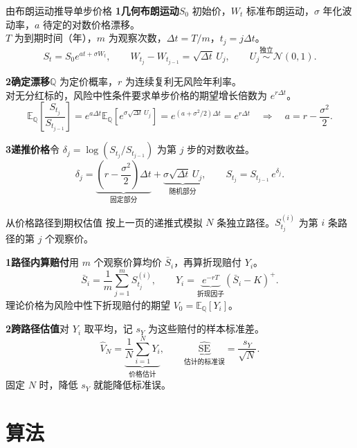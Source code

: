\begin{frame}{由布朗运动推导单步价格}
\textbf{1\quad 几何布朗运动}\quad \(S_0\) 初始价，\(W_t\) 标准布朗运动，\(\sigma\) 年化波动率，\(a\) 待定的对数价格漂移。\\
\(T\) 为到期时间（年），\(m\) 为观察次数，\(\Delta t=T/m\)，\(t_j=j\Delta t\)。
\[
 S_t=S_0e^{at+\sigma W_t},
 \qquad W_{t_j}-W_{t_{j-1}}=\sqrt{\Delta t}\,U_j,
 \qquad U_j\overset{\text{独立}}{\sim}\mathcal N(0,1).
\]

\medskip
\textbf{2\quad 确定漂移}\quad \(\mathbb Q\) 为定价概率，\(r\) 为连续复利无风险年利率。\\
对无分红标的，风险中性条件要求单步价格的期望增长倍数为 \(e^{r\Delta t}\)。
\[
 \mathbb E_{\mathbb Q}\!\left[\frac{S_{t_j}}{S_{t_{j-1}}}\right]
 =e^{a\Delta t}\mathbb E_{\mathbb Q}\!\left[e^{\sigma\sqrt{\Delta t}\,U_j}\right]
 =e^{(a+\sigma^2/2)\Delta t}
 =e^{r\Delta t}
 \quad\Longrightarrow\quad a=r-\frac{\sigma^2}{2}.
\]

\textbf{3\quad 递推价格}\quad 令 \(\delta_j=\log(S_{t_j}/S_{t_{j-1}})\) 为第 \(j\) 步的对数收益。
\[
 \delta_j=
 \underbrace{\left(r-\frac{\sigma^2}{2}\right)\Delta t}_{\text{固定部分}}
 +\underbrace{\sigma\sqrt{\Delta t}\,U_j}_{\text{随机部分}},
 \qquad S_{t_j}=S_{t_{j-1}}\,e^{\delta_j}.
\]
\end{frame}

\begin{frame}{从价格路径到期权估值}
按上一页的递推式模拟 \(N\) 条独立路径。\(S_{t_j}^{(i)}\) 为第 \(i\) 条路径的第 \(j\) 个观察价。

\bigskip
\textbf{1\quad 路径内算赔付}\quad 用 \(m\) 个观察价算均价 \(\bar S_i\)，再算折现赔付 \(Y_i\)。
\[
 \bar S_i=\frac1m\sum_{j=1}^m S_{t_j}^{(i)},
 \qquad Y_i=\underbrace{e^{-rT}}_{\text{折现因子}}(\bar S_i-K)^+ .
\]
理论价格为风险中性下折现赔付的期望 \(V_0=\mathbb E_{\mathbb Q}[Y_i]\)。

\bigskip
\textbf{2\quad 跨路径估值}\quad 对 \(Y_i\) 取平均，记 \(s_Y\) 为这些赔付的样本标准差。
\[
 \widehat V_N=\underbrace{\frac1N\sum_{i=1}^N Y_i}_{\text{价格估计}},
 \qquad \underbrace{\widehat{\mathrm{SE}}}_{\text{估计的标准误}}=\frac{s_Y}{\sqrt N}.
\]
固定 \(N\) 时，降低 \(s_Y\) 就能降低标准误。
\end{frame}

\section{算法}

